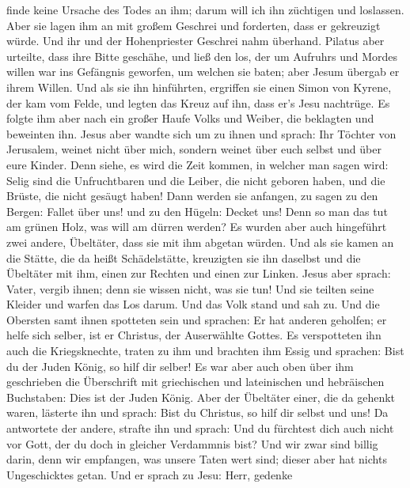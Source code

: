 finde keine Ursache des Todes an ihm; darum will ich ihn züchtigen und
loslassen.  Aber sie lagen ihm an mit großem Geschrei und
forderten, dass er gekreuzigt würde. Und ihr und der Hohenpriester
Geschrei nahm überhand.  Pilatus aber urteilte, dass ihre
Bitte geschähe,  und ließ den los, der um Aufruhrs und
Mordes willen war ins Gefängnis geworfen, um welchen sie baten; aber
Jesum übergab er ihrem Willen.  Und als sie ihn hinführten,
ergriffen sie einen Simon von Kyrene, der kam vom Felde, und legten das
Kreuz auf ihn, dass er's Jesu nachtrüge.  Es folgte ihm
aber nach ein großer Haufe Volks und Weiber, die beklagten und beweinten
ihn.  Jesus aber wandte sich um zu ihnen und sprach: Ihr
Töchter von Jerusalem, weinet nicht über mich, sondern weinet über euch
selbst und über eure Kinder.  Denn siehe, es wird die Zeit
kommen, in welcher man sagen wird: Selig sind die Unfruchtbaren und die
Leiber, die nicht geboren haben, und die Brüste, die nicht gesäugt
haben!  Dann werden sie anfangen, zu sagen zu den Bergen:
Fallet über uns! und zu den Hügeln: Decket uns!  Denn so
man das tut am grünen Holz, was will am dürren werden?  Es
wurden aber auch hingeführt zwei andere, Übeltäter, dass sie mit ihm
abgetan würden.  Und als sie kamen an die Stätte, die da
heißt Schädelstätte, kreuzigten sie ihn daselbst und die Übeltäter mit
ihm, einen zur Rechten und einen zur Linken.  Jesus aber
sprach: Vater, vergib ihnen; denn sie wissen nicht, was sie tun! Und sie
teilten seine Kleider und warfen das Los darum.  Und das
Volk stand und sah zu. Und die Obersten samt ihnen spotteten sein und
sprachen: Er hat anderen geholfen; er helfe sich selber, ist er
Christus, der Auserwählte Gottes.  Es verspotteten ihn auch
die Kriegsknechte, traten zu ihm und brachten ihm Essig 
und sprachen: Bist du der Juden König, so hilf dir selber! 
Es war aber auch oben über ihm geschrieben die Überschrift mit
griechischen und lateinischen und hebräischen Buchstaben: Dies ist der
Juden König.  Aber der Übeltäter einer, die da gehenkt
waren, lästerte ihn und sprach: Bist du Christus, so hilf dir selbst und
uns!  Da antwortete der andere, strafte ihn und sprach: Und
du fürchtest dich auch nicht vor Gott, der du doch in gleicher
Verdammnis bist?  Und wir zwar sind billig darin, denn wir
empfangen, was unsere Taten wert sind; dieser aber hat nichts
Ungeschicktes getan.  Und er sprach zu Jesu: Herr, gedenke
